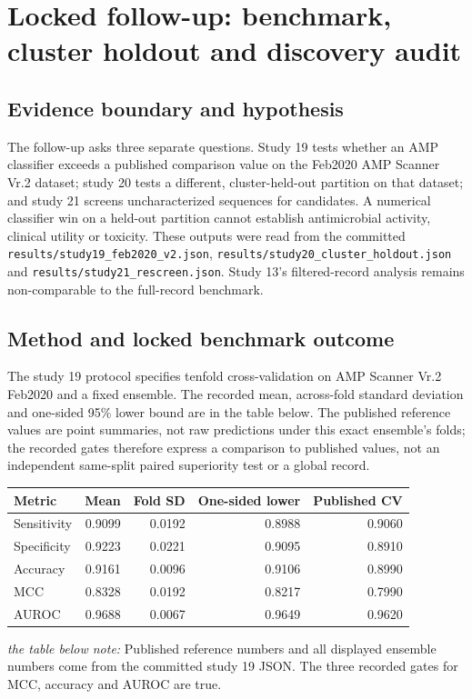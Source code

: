 \clearpage
\section{Locked follow-up: benchmark, cluster holdout and discovery audit}
\label{sec:lockedfollowup}
\subsection{Evidence boundary and hypothesis}
The follow-up asks three separate questions. Study 19 tests whether an AMP classifier exceeds a published comparison value on the Feb2020 AMP Scanner Vr.2 dataset; study 20 tests a different, cluster-held-out partition on that dataset; and study 21 screens uncharacterized sequences for candidates. A numerical classifier win on a held-out partition cannot establish antimicrobial activity, clinical utility or toxicity. These outputs were read from the committed \texttt{results/study19\_feb2020\_v2.json}, \texttt{results/study20\_cluster\_holdout.json} and \texttt{results/study21\_rescreen.json}. Study 13's filtered-record analysis remains non-comparable to the full-record benchmark.
\subsection{Method and locked benchmark outcome}
The study 19 protocol specifies tenfold cross-validation on AMP Scanner Vr.2 Feb2020 and a fixed ensemble. The recorded mean, across-fold standard deviation and one-sided 95\% lower bound are in the table below. The published reference values are point summaries, not raw predictions under this exact ensemble's folds; the recorded gates therefore express a comparison to published values, not an independent same-split paired superiority test or a global record.
\begin{center}\begin{tabular}{lrrrr}\hline
Metric & Mean & Fold SD & One-sided lower & Published CV\\\hline
Sensitivity & 0.9099 & 0.0192 & 0.8988 & 0.9060\\
Specificity & 0.9223 & 0.0221 & 0.9095 & 0.8910\\
Accuracy & 0.9161 & 0.0096 & 0.9106 & 0.8990\\
MCC & 0.8328 & 0.0192 & 0.8217 & 0.7990\\
AUROC & 0.9688 & 0.0067 & 0.9649 & 0.9620\\\hline
\end{tabular}\end{center}
\noindent\textit{the table below note:} Published reference numbers and all displayed ensemble numbers come from the committed study 19 JSON. The three recorded gates for MCC, accuracy and AUROC are true.
